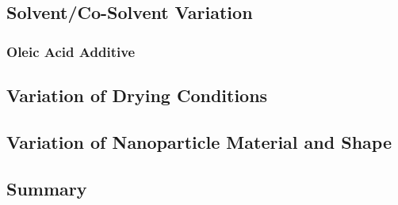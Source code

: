 \documentclass[\main/dresen_thesis.tex]{subfiles}
\renewcommand{\thisPath}{\main/chapters/monolayers/preparationMonolayers}
\begin{document}
    \label{sec:monolayers:preparation}
    \subsection{Solvent/Co-Solvent Variation}
      
      \FloatBarrier
      \subsubsection{Oleic Acid Additive}
        
        \FloatBarrier

    \subsection{Variation of Drying Conditions}
      
      \FloatBarrier

    \subsection{Variation of Nanoparticle Material and Shape}
      
      \FloatBarrier

    \subsection{Summary}
      
      \FloatBarrier
\end{document}
